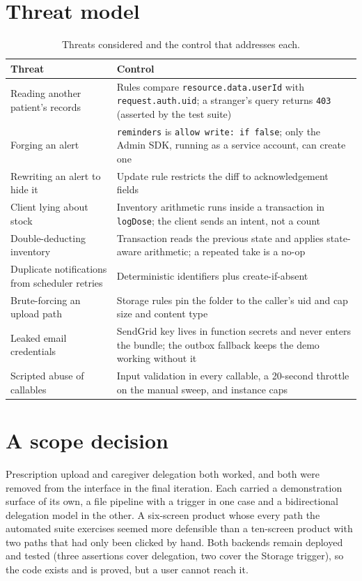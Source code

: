 \documentclass[11pt,a4paper]{report}
\begin{document}
\section{Threat model}

\begin{table}[h]
\centering
\caption{Threats considered and the control that addresses each.}
\label{tab:threats}
\small
\begin{tabularx}{\textwidth}{@{}>{\raggedright\arraybackslash}p{4.6cm} X@{}}
\toprule
\textbf{Threat} & \textbf{Control} \\
\midrule
Reading another patient's records & Rules compare \texttt{resource.data.userId} with \texttt{request.auth.uid}; a stranger's query returns \texttt{403} (asserted by the test suite) \\
Forging an alert & \texttt{reminders} is \texttt{allow write: if false}; only the Admin SDK, running as a service account, can create one \\
Rewriting an alert to hide it & Update rule restricts the diff to acknowledgement fields \\
Client lying about stock & Inventory arithmetic runs inside a transaction in \texttt{logDose}; the client sends an intent, not a count \\
Double-deducting inventory & Transaction reads the previous state and applies state-aware arithmetic; a repeated take is a no-op \\
Duplicate notifications from scheduler retries & Deterministic identifiers plus create-if-absent \\
Brute-forcing an upload path & Storage rules pin the folder to the caller's uid and cap size and content type \\
Leaked email credentials & SendGrid key lives in function secrets and never enters the bundle; the outbox fallback keeps the demo working without it \\
Scripted abuse of callables & Input validation in every callable, a 20-second throttle on the manual sweep, and instance caps \\
\bottomrule
\end{tabularx}
\end{table}

\section{A scope decision}
\label{sec:scope-cut}

Prescription upload and caregiver delegation both worked, and both were removed from the interface in
the final iteration. Each carried a demonstration surface of its own, a file pipeline with a trigger in
one case and a bidirectional delegation model in the other. A six-screen product whose every path the
automated suite exercises seemed more defensible than a ten-screen product with two paths that had only
been clicked by hand. Both backends remain deployed and tested (three assertions cover delegation, two
cover the Storage trigger), so the code exists and is proved, but a user cannot reach it.
\end{document}
